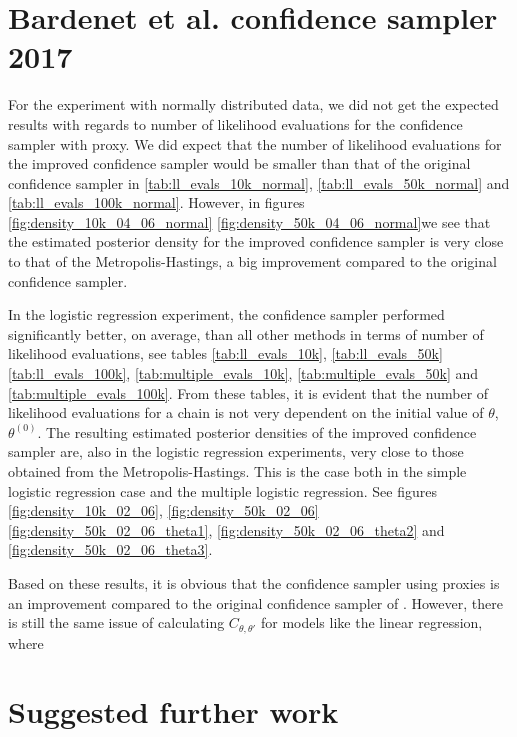 \section{Bardenet et al. confidence sampler 2017}
For the experiment with normally distributed data, we did not get the expected results with regards to number of likelihood evaluations for the confidence sampler with proxy. We did expect that the number of likelihood evaluations for the improved confidence sampler would be smaller than that of the original confidence sampler in \ref{tab:ll_evals_10k_normal}, \ref{tab:ll_evals_50k_normal} and \ref{tab:ll_evals_100k_normal}. However, in figures \ref{fig:density_10k_04_06_normal} \ref{fig:density_50k_04_06_normal}we see that the estimated posterior density for the improved confidence sampler is very close to that of the Metropolis-Hastings, a big improvement compared to the original confidence sampler. 

In the logistic regression experiment, the confidence sampler performed significantly better, on average, than all other methods in terms of number of likelihood evaluations, see tables \ref{tab:ll_evals_10k}, \ref{tab:ll_evals_50k} \ref{tab:ll_evals_100k}, \ref{tab:multiple_evals_10k}, \ref{tab:multiple_evals_50k} and \ref{tab:multiple_evals_100k}. From these tables, it is evident that the number of likelihood evaluations for a chain is not very dependent on the initial value of $\theta$, $\theta^{\left(0\right)}$.  The resulting estimated posterior densities of the improved confidence sampler are, also in the logistic regression experiments, very close to those obtained from the Metropolis-Hastings. This is the case both in the simple logistic regression case and the multiple logistic regression. See figures \ref{fig:density_10k_02_06}, \ref{fig:density_50k_02_06} \ref{fig:density_50k_02_06_theta1}, \ref{fig:density_50k_02_06_theta2} and \ref{fig:density_50k_02_06_theta3}.  

Based on these results, it is obvious that the confidence sampler using proxies is an improvement compared to the original confidence sampler of \cite{Bardenet:2}. However, there is still the same issue of calculating $C_{\theta, \theta'}$ for models like the linear regression, where 

\section{Suggested further work}
